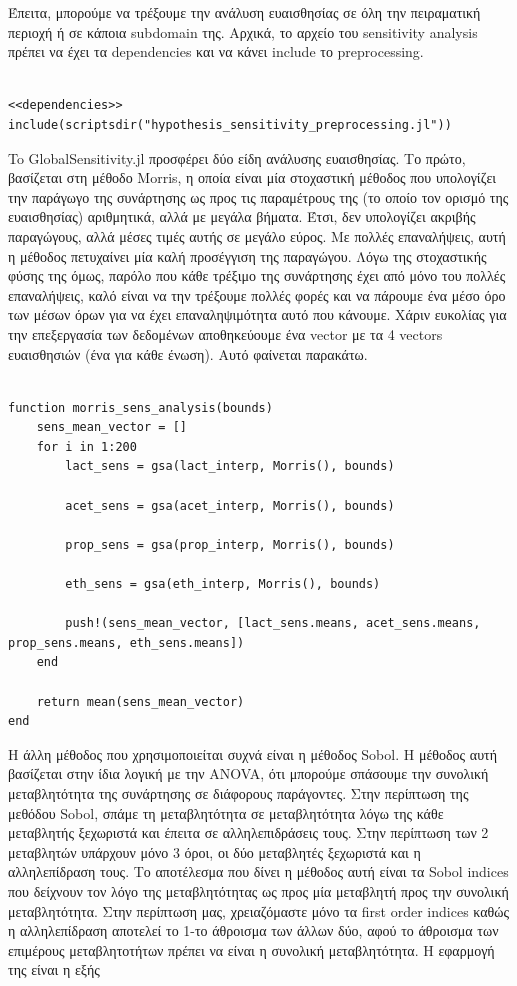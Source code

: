 \documentclass[11pt]{article}
\begin{document}
Έπειτα, μπορούμε να τρέξουμε την ανάλυση ευαισθησίας σε όλη την πειραματική περιοχή ή σε κάποια subdomain της. Αρχικά, το αρχείο του sensitivity analysis πρέπει να έχει τα dependencies και να κάνει include το preprocessing.

\begin{verbatim}

<<dependencies>>
include(scriptsdir("hypothesis_sensitivity_preprocessing.jl"))

\end{verbatim}

To GlobalSensitivity.jl προσφέρει δύο είδη ανάλυσης ευαισθησίας. Το πρώτο, βασίζεται στη μέθοδο Morris, η οποία είναι μία στοχαστική μέθοδος που υπολογίζει την παράγωγο της συνάρτησης ως προς τις παραμέτρους της (το οποίο τον ορισμό της ευαισθησίας) αριθμητικά, αλλά με μεγάλα βήματα. Έτσι, δεν υπολογίζει ακριβής παραγώγους, αλλά μέσες τιμές αυτής σε μεγάλο εύρος. Με πολλές επαναλήψεις, αυτή η μέθοδος πετυχαίνει μία καλή προσέγγιση της παραγώγου. Λόγω της στοχαστικής φύσης της όμως, παρόλο που κάθε τρέξιμο της συνάρτησης έχει από μόνο του πολλές επαναλήψεις, καλό είναι να την τρέξουμε πολλές φορές και να πάρουμε ένα μέσο όρο των μέσων όρων για να έχει επαναληψιμότητα αυτό που κάνουμε. Χάριν ευκολίας για την επεξεργασία των δεδομένων αποθηκεύουμε ένα vector με τα 4 vectors ευαισθησιών (ένα για κάθε ένωση). Αυτό φαίνεται παρακάτω.

\begin{verbatim}

function morris_sens_analysis(bounds)
    sens_mean_vector = []
    for i in 1:200
        lact_sens = gsa(lact_interp, Morris(), bounds)

        acet_sens = gsa(acet_interp, Morris(), bounds)

        prop_sens = gsa(prop_interp, Morris(), bounds)

        eth_sens = gsa(eth_interp, Morris(), bounds)

        push!(sens_mean_vector, [lact_sens.means, acet_sens.means, prop_sens.means, eth_sens.means])
    end

    return mean(sens_mean_vector)
end

\end{verbatim}

Η άλλη μέθοδος που χρησιμοποιείται συχνά είναι η μέθοδος Sobol. Η μέθοδος αυτή βασίζεται στην ίδια λογική με την ANOVA, ότι μπορούμε σπάσουμε την συνολική μεταβλητότητα της συνάρτησης σε διάφορους παράγοντες. Στην περίπτωση της μεθόδου Sobol, σπάμε τη μεταβλητότητα σε μεταβλητότητα λόγω της κάθε μεταβλητής ξεχωριστά και έπειτα σε αλληλεπιδράσεις τους. Στην περίπτωση των 2 μεταβλητών υπάρχουν μόνο 3 όροι, οι δύο μεταβλητές ξεχωριστά και η αλληλεπίδραση τους. Το αποτέλεσμα που δίνει η μέθοδος αυτή είναι τα Sobol indices που δείχνουν τον λόγο της μεταβλητότητας ως προς μία μεταβλητή προς την συνολική μεταβλητότητα. Στην περίπτωση μας, χρειαζόμαστε μόνο τα first order indices καθώς η αλληλεπίδραση αποτελεί το 1-το άθροισμα των άλλων δύο, αφού το άθροισμα των επιμέρους μεταβλητοτήτων πρέπει να είναι η συνολική μεταβλητότητα. Η εφαρμογή της είναι η εξής
\end{document}
